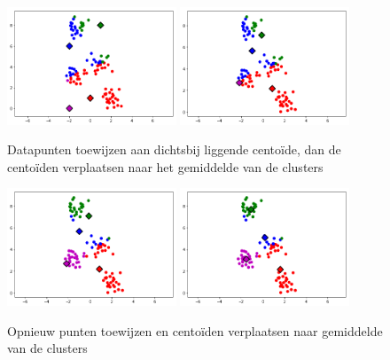 \documentclass{article}
\begin{document}
\begin{figure}[H]
    \centering
    \includegraphics[width=0.45\textwidth]{k-means-3.png}
    \includegraphics[width=0.45\textwidth]{k-means-4.png}
    \caption{Datapunten toewijzen aan dichtsbij liggende centoïde, dan de centoïden verplaatsen naar het gemiddelde van de clusters}
\end{figure}


\begin{figure}[H]
    \centering
    \includegraphics[width=0.45\textwidth]{k-means-5.png}
    \includegraphics[width=0.45\textwidth]{k-means-6.png}
    \caption{Opnieuw punten toewijzen en centoïden verplaatsen naar gemiddelde van de clusters}
\end{figure}
\end{document}
